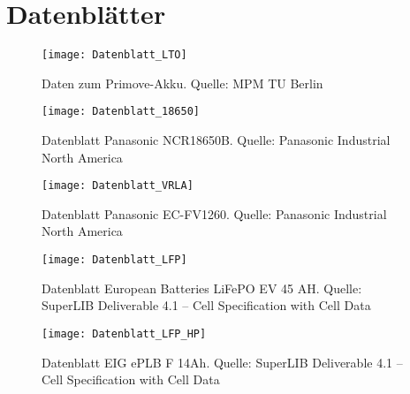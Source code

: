 \appendix
\label{an_Datenblaetter}
\chapter{Datenblätter}
\begin{figure}[h!]\centering
	\texttt{[image: Datenblatt\_LTO]}
	\caption[Daten zum Primove-Akku]{Daten zum Primove-Akku. Quelle: MPM TU Berlin}
\end{figure}

\begin{figure}\centering
	\texttt{[image: Datenblatt\_18650]}
	\caption[Datenblatt Panasonic NCR18650B]{Datenblatt Panasonic NCR18650B. Quelle: Panasonic Industrial North America}
\end{figure}

\begin{figure}\centering
	\texttt{[image: Datenblatt\_VRLA]}
	\caption[Datenblatt Panasonic EC-FV1260]{Datenblatt Panasonic EC-FV1260. Quelle: Panasonic Industrial North America}
\end{figure}

\begin{figure}\centering
	\texttt{[image: Datenblatt\_LFP]}
	\caption[Datenblatt European Batteries LiFePO EV 45 Ah]{Datenblatt European Batteries LiFePO EV 45 AH. Quelle: SuperLIB Deliverable 4.1 – Cell Specification with Cell Data}
\end{figure}

\begin{figure}\centering
	\texttt{[image: Datenblatt\_LFP\_HP]}
	\caption[Datenblatt EIG ePLB F 14 Ah]{Datenblatt EIG ePLB F 14Ah. Quelle: SuperLIB Deliverable 4.1 – Cell Specification with Cell Data}
\end{figure}